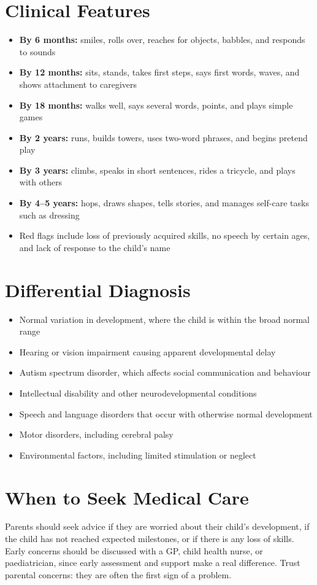\section*{Clinical Features}
\begin{itemize}
    \item \textbf{By 6 months:} smiles, rolls over, reaches for objects, babbles, and responds to sounds
    \item \textbf{By 12 months:} sits, stands, takes first steps, says first words, waves, and shows attachment to caregivers
    \item \textbf{By 18 months:} walks well, says several words, points, and plays simple games
    \item \textbf{By 2 years:} runs, builds towers, uses two-word phrases, and begins pretend play
    \item \textbf{By 3 years:} climbs, speaks in short sentences, rides a tricycle, and plays with others
    \item \textbf{By 4--5 years:} hops, draws shapes, tells stories, and manages self-care tasks such as dressing
    \item Red flags include loss of previously acquired skills, no speech by certain ages, and lack of response to the child's name
\end{itemize}

\section*{Differential Diagnosis}
\begin{itemize}
    \item Normal variation in development, where the child is within the broad normal range
    \item Hearing or vision impairment causing apparent developmental delay
    \item Autism spectrum disorder, which affects social communication and behaviour
    \item Intellectual disability and other neurodevelopmental conditions
    \item Speech and language disorders that occur with otherwise normal development
    \item Motor disorders, including cerebral palsy
    \item Environmental factors, including limited stimulation or neglect
\end{itemize}

\section*{When to Seek Medical Care}
Parents should seek advice if they are worried about their child's development, if the child has not reached expected milestones, or if there is any loss of skills. Early concerns should be discussed with a GP, child health nurse, or paediatrician, since early assessment and support make a real difference. Trust parental concerns: they are often the first sign of a problem.

